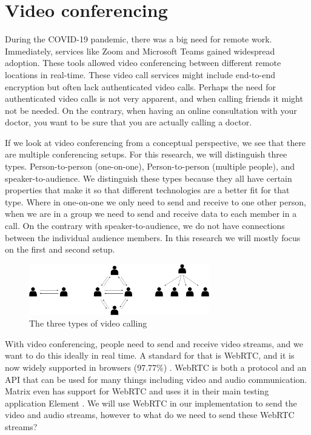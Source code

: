 \documentclass[11pt,a4paper]{article}
\begin{document}
\section{Video conferencing}
During the COVID-19 pandemic, there was a big need for remote work. Immediately, services like Zoom \cite{Zoom}  and Microsoft Teams  \cite{MSTeams} gained widespread adoption. These tools allowed video conferencing between different remote locations in real-time. These video call services might include end-to-end encryption but often lack authenticated video calls. Perhaps the need for authenticated video calls is not very apparent, and when calling friends it might not be needed. On the contrary, when having an online consultation with your doctor, you want to be sure that you are actually calling a doctor.

If we look at video conferencing from a conceptual perspective, we see that there are multiple conferencing setups. For this research, we will distinguish three types. Person-to-person (one-on-one), Person-to-person (multiple people), and speaker-to-audience. We distinguish these types because they all have certain properties that make it so that different technologies are a better fit for that type. Where in one-on-one we only need to send and receive to one other person, when we are in a group we need to send and receive data to each member in a call. On the contrary with speaker-to-audience, we do not have connections between the individual audience members. In this research we will mostly focus on the first and second setup.

\begin{figure}[!hbt]
    \centering
    \includegraphics[width=0.7\textwidth]{Research proposal/img/three types.drawio.png}
    \caption{The three types of video calling}
    \label{fig:enter-label}
\end{figure}

With video conferencing, people need to send and receive video streams, and we want to do this ideally in real time. A standard for that is WebRTC, and it is now widely supported in browsers (97.77\%) \cite{CIUIWEBRTC}. WebRTC is both a protocol and an API that can be used for many things including video and audio communication. Matrix even has support for WebRTC and uses it in their main testing application Element \cite{ELEMENT}. We will use WebRTC in our implementation to send the video and audio streams, however to what do we need to send these WebRTC streams?
\end{document}
